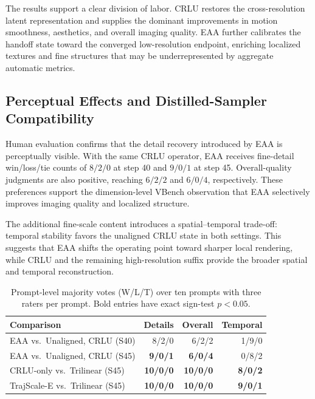 The results support a clear division of labor. CRLU restores the
cross-resolution latent representation and supplies the dominant
improvements in motion smoothness, aesthetics, and overall imaging
quality. EAA further calibrates the handoff state toward the converged
low-resolution endpoint, enriching localized textures and fine structures that may
be underrepresented by aggregate automatic metrics.

\subsection{Perceptual Effects and Distilled-Sampler Compatibility}

Human evaluation confirms that the detail recovery introduced by EAA is
perceptually visible. With the same CRLU operator, EAA receives
fine-detail win/loss/tie counts of \(8/2/0\) at step 40 and \(9/0/1\)
at step 45. Overall-quality judgments are also positive, reaching
\(6/2/2\) and \(6/0/4\), respectively. These preferences support the
dimension-level VBench observation that EAA selectively improves
imaging quality and localized structure.

The additional fine-scale content introduces a spatial--temporal
trade-off: temporal stability favors the unaligned CRLU state in both
settings. This suggests that EAA shifts the operating point toward
sharper local rendering, while CRLU and the remaining high-resolution
suffix provide the broader spatial and temporal reconstruction.

\begin{table}[!t]
\centering
\footnotesize
\setlength{\tabcolsep}{2pt}
\begin{tabular}{lrrr}
\toprule
Comparison & Details & Overall & Temporal \\
\midrule
EAA vs.\ Unaligned, CRLU (S40) & 8/2/0 & 6/2/2 & 1/9/0 \\
EAA vs.\ Unaligned, CRLU (S45) &
\textbf{9/0/1} & \textbf{6/0/4} & 0/8/2 \\
CRLU-only vs.\ Trilinear (S45) &
\textbf{10/0/0} & \textbf{10/0/0} & \textbf{8/0/2} \\
TrajScale-E vs.\ Trilinear (S45) &
\textbf{10/0/0} & \textbf{10/0/0} & \textbf{9/0/1} \\
\bottomrule
\end{tabular}
\caption{Prompt-level majority votes (W/L/T) over ten prompts with three
raters per prompt. Bold entries have exact sign-test \(p<0.05\).}
\label{tab:human}
\end{table}

